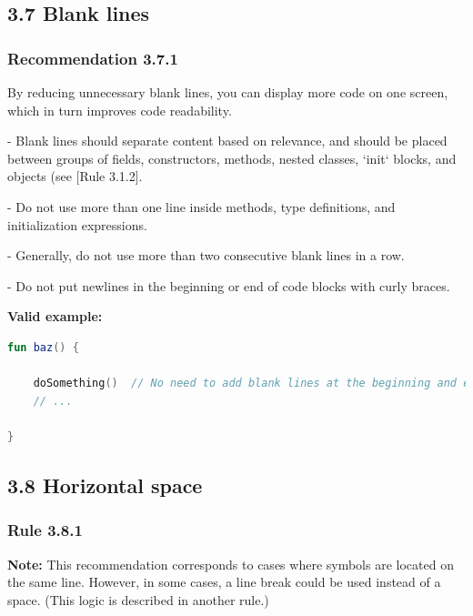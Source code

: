 {{\subsection*{\textbf{3.7 Blank lines}}

\subsubsection*{\textbf{Recommendation 3.7.1}}
\leavevmode\newline



By reducing unnecessary blank lines, you can display more code on one screen, which in turn improves code readability.



- Blank lines should separate content based on relevance, and should be placed between groups of fields, constructors, methods, nested classes, `init` blocks, and objects (see [Rule 3.1.2].

- Do not use more than one line inside methods, type definitions, and initialization expressions.

- Generally, do not use more than two consecutive blank lines in a row.

- Do not put newlines in the beginning or end of code blocks with curly braces.



\textbf{Valid example:}

\begin{lstlisting}[language=Kotlin]
fun baz() {
        
    doSomething()  // No need to add blank lines at the beginning and end of the code block
    // ...

}
\end{lstlisting}


\subsection*{\textbf{3.8 Horizontal space}}

\subsubsection*{\textbf{Rule 3.8.1}}
\leavevmode\newline



\textbf{Note:} This recommendation corresponds to cases where symbols are located on the same line. However, in some cases, a line break could be used instead of a space. (This logic is described in another rule.)



}}
